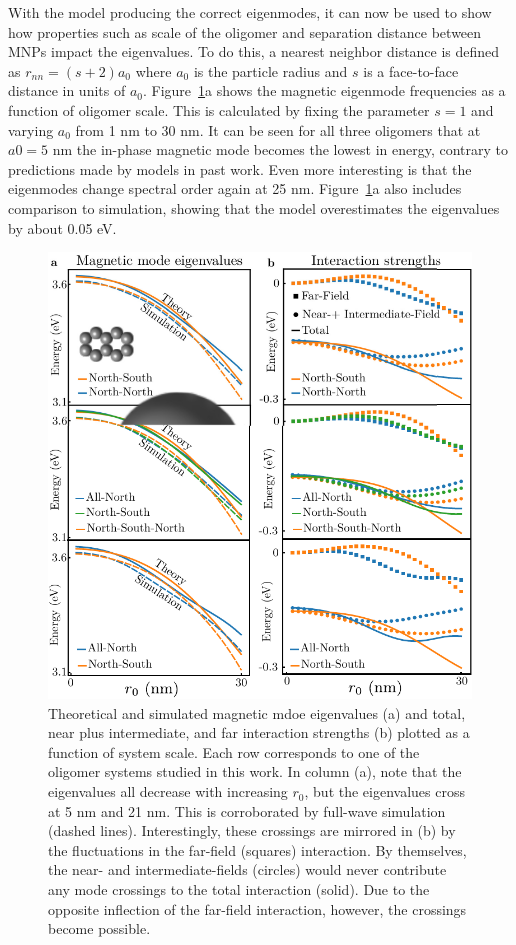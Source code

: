 \documentclass[journal=apchd5,manuscript=article]{achemso}
\begin{document}
With the model producing the correct eigenmodes, it can now be used to show how properties such as scale of the oligomer and separation distance between MNPs impact the eigenvalues. To do this, a nearest neighbor distance is defined as $r_{nn} = (s+2)a_0$ where $a_0$ is the particle radius and $s$ is a face-to-face distance in units of $a_0$. Figure~\ref{scaling}a shows the magnetic eigenmode frequencies as a function of oligomer scale. This is calculated by fixing the parameter $s=1$ and varying $a_0$ from 1 nm to 30 nm. It can be seen for all three oligomers that at $a0 = 5$ nm the in-phase magnetic mode becomes the lowest in energy, contrary to predictions made by models in past work. Even more interesting is that the eigenmodes change spectral order again at 25 nm. Figure~\ref{scaling}a also includes comparison to simulation, showing that the model overestimates the eigenvalues by about 0.05 eV. 

\begin{figure}
\includegraphics[width=7in]{scale_eigs.pdf}
\caption{Theoretical and simulated magnetic mdoe eigenvalues (a) and total, near plus intermediate, and far interaction strengths (b) plotted as a function of system scale. Each row corresponds to one of the oligomer systems studied in this work. In column (a), note that the eigenvalues all decrease with increasing $r_0$, but the eigenvalues cross at 5 nm and 21 nm. This is corroborated by full-wave simulation (dashed lines). Interestingly, these crossings are mirrored in (b) by the fluctuations in the far-field (squares) interaction. By themselves, the near- and intermediate-fields (circles) would never contribute any mode crossings to the total interaction (solid). Due to the opposite inflection of the far-field interaction, however, the crossings become possible.}
\label{scaling}
\end{figure}
\end{document}
